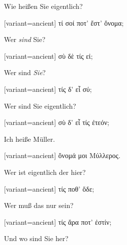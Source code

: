 Wie heißen Sie eigentlich?

\switchcolumn

\begin{greek}[variant=ancient]%
τί σοί ποτ' ἔστ' ὄνομα;

\end{greek}%
\switchcolumn*

Wer \emph{sind} Sie?

\switchcolumn

\begin{greek}[variant=ancient]%
σὺ δὲ τίς εἰ;

\end{greek}%
\switchcolumn*

Wer sind \emph{Sie}?

\switchcolumn

\begin{greek}[variant=ancient]%
τίς δ' εἶ σύ;

\end{greek}%
\switchcolumn*

Wer sind Sie eigentlich?

\switchcolumn

\begin{greek}[variant=ancient]%
σὺ δ' εἶ τίς ἐτεόν;

\end{greek}%
\switchcolumn*

Ich heiße Müller.

\switchcolumn

\begin{greek}[variant=ancient]%
ὄνομά μοι Μύλλερος.

\end{greek}%
\switchcolumn*

Wer ist eigentlich der hier?

\switchcolumn

\begin{greek}[variant=ancient]%
τίς ποθ' ὅδε;

\end{greek}%
\switchcolumn*

Wer muß das nur sein?

\switchcolumn

\begin{greek}[variant=ancient]%
τίς ἄρα ποτ' ἐστίν;

\end{greek}%
\switchcolumn*

Und wo sind Sie her?

\switchcolumn

